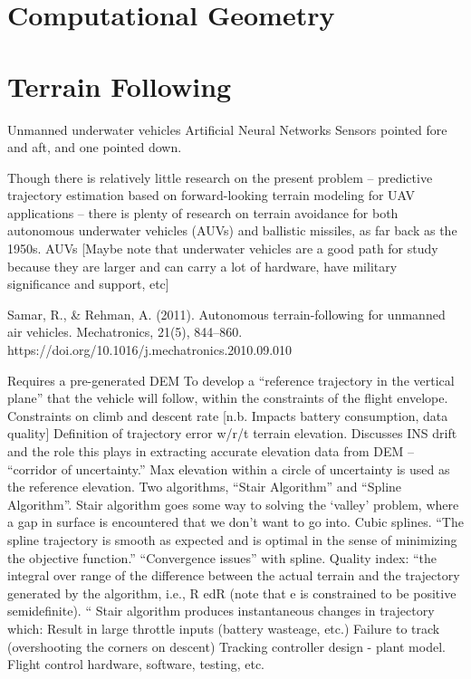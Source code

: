\section{Computational Geometry}



\section{Terrain Following}

Unmanned underwater vehicles
Artificial Neural Networks
Sensors pointed fore and aft, and one pointed down.

Though there is relatively little research on the present problem -- predictive trajectory estimation based on forward-looking terrain modeling for UAV applications -- there is plenty of research on terrain avoidance for both autonomous underwater vehicles (AUVs) and ballistic missiles, as far back as the 1950s. 
AUVs
[Maybe note that underwater vehicles are a good path for study because they are larger and can carry a lot of hardware, have military significance and support, etc]

\cite{Samar2011}
Samar, R., \& Rehman, A. (2011). Autonomous terrain-following for unmanned air vehicles. Mechatronics, 21(5), 844–860. https://doi.org/10.1016/j.mechatronics.2010.09.010

Requires a pre-generated DEM
To develop a “reference trajectory in the vertical plane” that the vehicle will follow, within the constraints of the flight envelope.
Constraints on climb and descent rate [n.b. Impacts battery consumption, data quality]
Definition of trajectory error w/r/t terrain elevation.
Discusses INS drift and the role this plays in extracting accurate elevation data from DEM -- “corridor of uncertainty.”
Max elevation within a circle of uncertainty is used as the reference elevation.
Two algorithms, “Stair Algorithm” and “Spline Algorithm”.
Stair algorithm goes some way to solving the ‘valley’ problem, where a gap in surface is encountered that we don’t want to go into.
Cubic splines.
“The spline trajectory is smooth as expected and is optimal in the sense of minimizing the objective function.”
“Convergence issues” with spline.
Quality index: “the integral over range of the difference between the actual terrain and the trajectory generated by the algorithm, i.e., R edR (note that e is constrained to be positive semidefinite). “
Stair algorithm produces instantaneous changes in trajectory which:
Result in large throttle inputs (battery wasteage, etc.)
Failure to track (overshooting the corners on descent)
Tracking controller design - plant model.
Flight control hardware, software, testing, etc.

